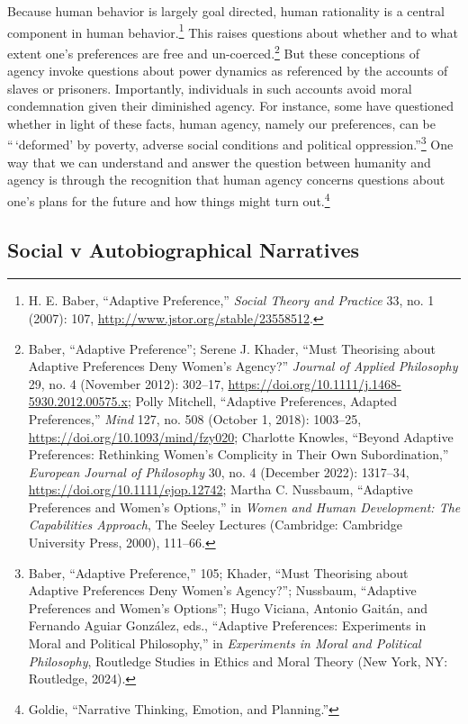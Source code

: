 \documentclass[phdthesis,12pt,final,a4paper]{wuthesis}
\theoremstyle{definition}
\theoremstyle{definition}
\theoremstyle{definition}
\theoremstyle{definition}
\theoremstyle{remark}
\begin{document}
Because human behavior is largely goal directed, human rationality is a central component in human behavior.\footnote{H. E. Baber, {``Adaptive {Preference},''} \emph{Social Theory and Practice} 33, no. 1 (2007): 107, \url{http://www.jstor.org/stable/23558512}.} This raises questions about whether and to what extent one's preferences are free and un-coerced.\footnote{Baber, {``Adaptive {Preference}''}; Serene J. Khader, {``Must {Theorising} about {Adaptive Preferences Deny Women}'s {Agency}?''} \emph{Journal of Applied Philosophy} 29, no. 4 (November 2012): 302--17, \url{https://doi.org/10.1111/j.1468-5930.2012.00575.x}; Polly Mitchell, {``Adaptive {Preferences}, {Adapted Preferences},''} \emph{Mind} 127, no. 508 (October 1, 2018): 1003--25, \url{https://doi.org/10.1093/mind/fzy020}; Charlotte Knowles, {``Beyond Adaptive Preferences: {Rethinking} Women's Complicity in Their Own Subordination,''} \emph{European Journal of Philosophy} 30, no. 4 (December 2022): 1317--34, \url{https://doi.org/10.1111/ejop.12742}; Martha C. Nussbaum, {``Adaptive {Preferences} and {Women}'s {Options},''} in \emph{Women and Human Development: {The} Capabilities Approach}, The Seeley Lectures (Cambridge: Cambridge University Press, 2000), 111--66.} But these conceptions of agency invoke questions about power dynamics as referenced by the accounts of slaves or prisoners. Importantly, individuals in such accounts avoid moral condemnation given their diminished agency. For instance, some have questioned whether in light of these facts, human agency, namely our preferences, can be ``\,`deformed' by poverty, adverse social conditions and political oppression.''\footnote{Baber, {``Adaptive {Preference},''} 105; Khader, {``Must {Theorising} about {Adaptive Preferences Deny Women}'s {Agency}?''}; Nussbaum, {``Adaptive {Preferences} and {Women}'s {Options}''}; Hugo Viciana, Antonio Gaitán, and Fernando Aguiar González, eds., {``Adaptive {Preferences}: {Experiments} in {Moral} and {Political Philosophy},''} in \emph{Experiments in Moral and Political Philosophy}, Routledge Studies in Ethics and Moral Theory (New York, NY: Routledge, 2024).} One way that we can understand and answer the question between humanity and agency is through the recognition that human agency concerns questions about one's plans for the future and how things might turn out.\footnote{Goldie, {``Narrative {Thinking}, {Emotion}, and {Planning}.''}}

\subsection*{Social v Autobiographical Narratives}\label{social-v-autobiographical-narratives}
\end{document}
